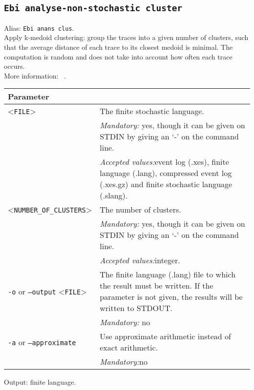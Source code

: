 {\subsection{\texttt{Ebi analyse-non-stochastic cluster}}
\label{command:Ebi analyse-non-stochastic cluster}
Alias: \texttt{Ebi anans clus}.\\
Apply k-medoid clustering: group the traces into a given number of clusters, such that the average distance of each trace to its closest medoid is minimal. The computation is random and does not take into account how often each trace occurs.\\
More information: ~\cite{DBLP:journals/is/SchubertR21}.\\
\begin{tabularx}{\linewidth}{lX}
\toprule
Parameter \\\midrule
<\texttt{FILE}>&The finite stochastic language.\\
&\textit{Mandatory:} \quad yes, though it can be given on STDIN by giving an `-' on the command line.\\
&\textit{Accepted values:}\quad event log (.xes), finite language (.lang), compressed event log (.xes.gz) and finite stochastic language (.slang).\\
<\texttt{NUMBER\_OF\_CLUSTERS}>&The number of clusters.\\
&\textit{Mandatory:} \quad yes, though it can be given on STDIN by giving an `-' on the command line.\\
&\textit{Accepted values:}\quad integer.\\
\texttt{-o} or \texttt{--output} <\texttt{FILE}> &
The finite language (.lang) file to which the result must be written. If the parameter is not given, the results will be written to STDOUT.\\
&\textit{Mandatory:} \quad no\\
\texttt{-a} or \texttt{--approximate} & Use approximate arithmetic instead of exact arithmetic.\\
&\textit{Mandatory:}\quad no\\
\bottomrule
\end{tabularx}
Output: finite language.
}
